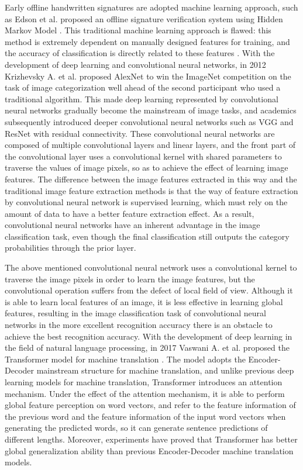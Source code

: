 \documentclass{article}
\begin{document}
Early offline handwritten signatures are adopted machine learning approach, such as Edson et al. proposed an offline signature verification system using Hidden Markov Model \cite{5}. This traditional machine learning approach is flawed: this method is extremely dependent on manually designed features for training, and the accuracy of classification is directly related to these features \cite{2}. With the development of deep learning and convolutional neural networks, in 2012 Krizhevsky A. et al. proposed AlexNet \cite{6} to win the ImageNet competition on the task of image categorization well ahead of the second participant who used a traditional algorithm. This made deep learning represented by convolutional neural networks gradually become the mainstream of image tasks, and academics subsequently introduced deeper convolutional neural networks such as VGG \cite{7} and ResNet \cite{8} with residual connectivity. These convolutional neural networks are composed of multiple convolutional layers and linear layers, and the front part of the convolutional layer uses a convolutional kernel with shared parameters to traverse the values of image pixels, so as to achieve the effect of learning image features. The difference between the image features extracted in this way and the traditional image feature extraction methods is that the way of feature extraction by convolutional neural network is supervised learning, which must rely on the amount of data to have a better feature extraction effect. As a result, convolutional neural networks have an inherent advantage in the image classification task, even though the final classification still outputs the category probabilities through the prior layer.

The above mentioned convolutional neural network uses a convolutional kernel to traverse the image pixels in order to learn the image features, but the convolutional operation suffers from the defect of local field of view. Although it is able to learn local features of an image, it is less effective in learning global features, resulting in the image classification task of convolutional neural networks in the more excellent recognition accuracy there is an obstacle to achieve the best recognition accuracy. With the development of deep learning in the field of natural language processing, in 2017 Vaswani A. et al. proposed the Transformer model for machine translation \cite{9}. The model adopts the Encoder-Decoder mainstream structure for machine translation, and unlike previous deep learning models for machine translation, Transformer introduces an attention mechanism. Under the effect of the attention mechanism, it is able to perform global feature perception on word vectors, and refer to the feature information of the previous word and the feature information of the input word vectors when generating the predicted words, so it can generate sentence predictions of different lengths. Moreover, experiments have proved that Transformer has better global generalization ability than previous Encoder-Decoder machine translation models.
\end{document}

